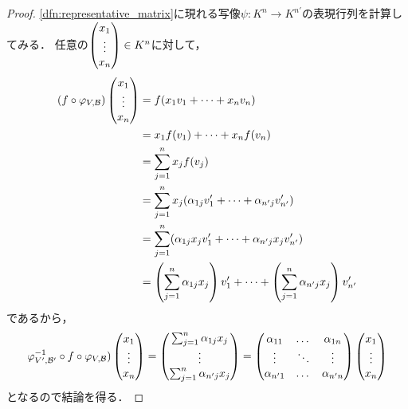 \begin{proof}
    \cref{dfn:representative_matrix}に現れる写像$\psi \colon K^n \to K^{n'}$の表現行列を計算してみる．
    任意の$\begin{pmatrix} x_1 \\ \vdots \\ x_n \end{pmatrix} \in K^n$に対して，
    \[
        \begin{aligned}
            (f \circ \varphi_{V,\calB})\pmt{x_1 \\ \vdots \\ x_n} %
            &= f(x_1 v_1 + \dots + x_n v_n) \\
            &= x_1 f(v_1) + \dots + x_n f(v_n) \\
            &= \sum_{j=1}^n x_j f(v_j) \\
            &= \sum_{j=1}^n x_j (\alpha_{1j} v'_1 + \dots + \alpha_{n'j} v'_{n'}) \\
            &= \sum_{j=1}^n (\alpha_{1j}x_j v'_1 + \dots + \alpha_{n'j}x_j v'_{n'}) \\
            &= \left(\sum_{j=1}^n \alpha_{1j}x_j\right) v'_1 + \dots + \left(\sum_{j=1}^n \alpha_{n'j}x_j\right) v'_{n'}
        \end{aligned}
    \]
    であるから，
    \[
        \varphi^{-1}_{V',\calB'} \circ f \circ \varphi_{V,\calB})\pmt{x_1 \\ \vdots \\ x_n} = \pmt{
            \sum_{j=1}^n \alpha_{1j}x_j \\
            \vdots \\
            \sum_{j=1}^n \alpha_{n'j}x_j
        } %
        = \pmt{\alpha_{11} & \dots & \alpha_{1n} \\%
        \vdots & \ddots & \vdots \\%
        \alpha_{n'1} & \dots & \alpha_{n'n}} \pmt{x_1 \\ \vdots \\ x_n}
    \]
    となるので結論を得る．
\end{proof}
